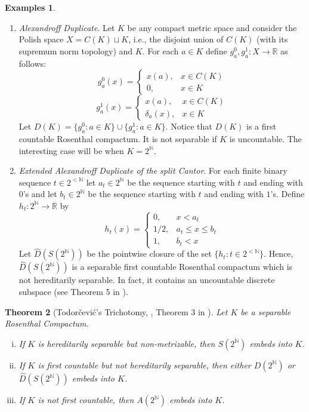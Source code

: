 \documentclass[psamsfonts]{amsart}
\newtheorem{thm}{Theorem}[section]
\theoremstyle{definition}
\newtheorem{exmps}[thm]{Examples}
\theoremstyle{remark}
\numberwithin{equation}{section}
\begin{document}
\begin{exmps}
\begin{enumerate}
    \item \emph{Alexandroff Duplicate}.
Let $K$ be any compact metric space and consider the Polish space $X=C(K)\sqcup K$, i.e., the disjoint union of $C(K)$ (with its supremum norm topology) and $K$.
For each $a\in K$ define $g_a^0,g_a^1:X\rightarrow\mathbb{R}$ as follows:
    $$g_a^0(x)=\left\{\begin{array}{cc}
        x(a), & x\in C(K) \\
        0, & x\in K
    \end{array}\right.$$
    $$g_a^1(x)=\left\{\begin{array}{cc}
        x(a), & x\in C(K) \\
        \delta_a(x), & x\in K
    \end{array}\right.$$
    Let $D(K)=\{g_a^0:a\in K\}\cup\{g_a^1:a\in K\}$.
Notice that $D(K)$ is a first countable Rosenthal compactum.
It is not separable if $K$ is uncountable.
The interesting case will be when $K=2^\mathbb{N}$.
    \item \emph{Extended Alexandroff Duplicate of the split Cantor}.
For each finite binary sequence $t\in 2^{<\mathbb{N}}$ let $a_t\in 2^\mathbb{N}$ be the sequence starting with $t$ and ending with $0$'s and let $b_t\in 2^\mathbb{N}$ be the sequence starting with $t$ and ending with $1$'s.
Define $h_t:2^\mathbb{N}\rightarrow\mathbb{R}$ by
    $$h_t(x)=\left\{\begin{array}{cc}
        0, & x<a_t \\
        1/2, & a_t\leq x \leq b_t \\
        1, & b_t<x
    \end{array}\right.$$
    Let $\hat{D}(S(2^\mathbb{N}))$ be the pointwise closure of the set $\{h_t:t\in 2^{<\mathbb{N}}\}$.
Hence, $\hat{D}(S(2^\mathbb{N}))$ is a separable first countable Rosenthal compactum which is not hereditarily separable.
In fact, it contains an uncountable discrete subspace (see Theorem 5 in \cite{Todorcevic_1999_CompactSubsetsBaire}).
\end{enumerate}

\end{exmps}

\begin{thm}[Todorčević's Trichotomy, \cite{Todorcevic_1999_CompactSubsetsBaire}, Theorem 3 in \cite{argyros2008rosenthal}]\label{T:Todorcevic trichotomy}
    Let $K$ be a separable Rosenthal Compactum.
    \begin{enumerate}[(i)] 
        \item 
        If $K$ is hereditarily separable but non-metrizable, then $S(2^\mathbb{N})$ embeds into $K$.
        \item 
        If $K$ is first countable but not hereditarily separable, then either $D(2^\mathbb{N})$ or $\hat{D}(S(2^\mathbb{N}))$ embeds into $K$.
        \item
         If $K$ is not first countable, then $A(2^\mathbb{N})$ embeds into $K$.
    \end{enumerate}
\end{thm}
\end{document}
